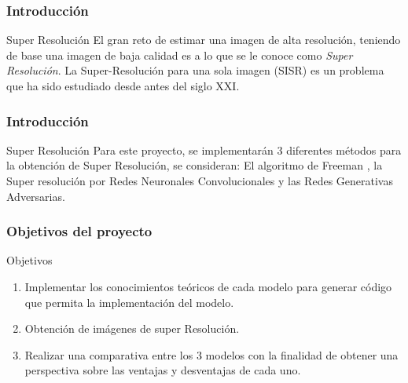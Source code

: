 \begin{frame}
    \frametitle{Introducción}
    \begin{block}{Super Resolución}
        El gran reto de estimar una imagen de alta resolución, teniendo de base una imagen de baja calidad es a lo que se le conoce como 
        \emph{Super Resolución}. La Super-Resolución para una sola imagen (SISR) es un problema que ha sido estudiado desde antes del siglo XXI.
    \end{block}

\end{frame}

\begin{frame}
    \frametitle{Introducción}
    \begin{block}{Super Resolución}
        Para este proyecto, se implementarán 3 diferentes métodos para la obtención de Super Resolución, se consideran: El algoritmo de Freeman \cite{freeman},
        la Super resolución por Redes Neuronales Convolucionales \cite{SRCNN} y las Redes Generativas Adversarias. \cite{SRGAN}
        \end{block}

\end{frame}


\begin{frame}

    \frametitle{Objetivos del proyecto}
    \begin{block}{Objetivos}
        \begin{enumerate}
            \item Implementar los conocimientos teóricos de cada modelo para generar código que
             permita la implementación del modelo.
            \item Obtención de imágenes de super Resolución. 
            \item Realizar una comparativa entre los 3 modelos con la finalidad de obtener
            una perspectiva sobre las ventajas y desventajas de cada uno.
        \end{enumerate}
    \end{block}

\end{frame}
